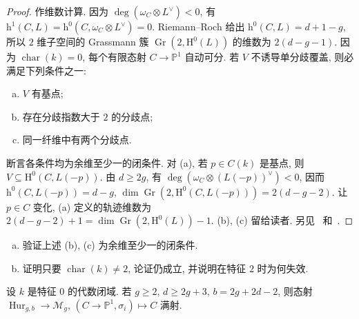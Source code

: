 \begin{proof}
作维数计算. 因为 $\deg(\omega_C\otimes L^\vee)<0$, 有 $\mathrm h^1(C,\allowbreak L)=\mathrm h^0(C,\allowbreak \omega_C\otimes L^\vee)=0$. Riemann--Roch 给出 $\mathrm h^0(C,\allowbreak L)=d+1-g$, 所以 $2$ 维子空间的 Grassmann 簇 $\operatorname{Gr}(2,\allowbreak \mathrm H^0(L))$ 的维数为 $2(d-g-1)$. 因为 $\operatorname{char}(k)=0$, 每个有限态射 $C\to\mathbb P^1$ 自动可分. 若 $V$ 不诱导单分歧覆盖, 则必满足下列条件之一:
\begin{enumerate}[(a)]
\item $V$ 有基点;
\item 存在分歧指数大于 $2$ 的分歧点;
\item 同一纤维中有两个分歧点.
\end{enumerate}
断言各条件均为余维至少一的闭条件. 对 (a), 若 $p\in C(k)$ 是基点, 则 $V\subseteq\mathrm H^0(C,\allowbreak L(-p))$. 由 $d\geq2g$, 有 $\deg(\omega_C\otimes(L(-p))^\vee)<0$, 因而 $\mathrm h^0(C,\allowbreak L(-p))=d-g$, $\dim\operatorname{Gr}(2,\allowbreak \mathrm H^0(C,\allowbreak L(-p)))=2(d-g-2)$. 让 $p\in C$ 变化, (a) 定义的轨迹维数为 $2(d-g-2)+1=\dim\operatorname{Gr}(2,\allowbreak \mathrm H^0(L))-1$. (b), (c) 留给读者. 另见~\cite{Sev21} 和~\cite[命题 8.1]{Ful69}.
\end{proof}
\begin{exercise}[细节]\label{src:6.7.17}
\begin{enumerate}[(a)]
\item 验证上述 (b), (c) 为余维至少一的闭条件.
\item 证明只要 $\operatorname{char}(k)\ne2$, 论证仍成立, 并说明在特征 $2$ 时为何失效.
\end{enumerate}
\end{exercise}
\begin{corollary}\label{src:6.7.18}
设 $k$ 是特征 $0$ 的代数闭域. 若 $g\geq2$, $d\geq2g+3$, $b=2g+2d-2$, 则态射 $\operatorname{Hur}_{g,\allowbreak b}\to\mathcal M_g$, $(C\to\mathbb P^1,\allowbreak \sigma_i)\mapsto C$ 满射.
\end{corollary}
